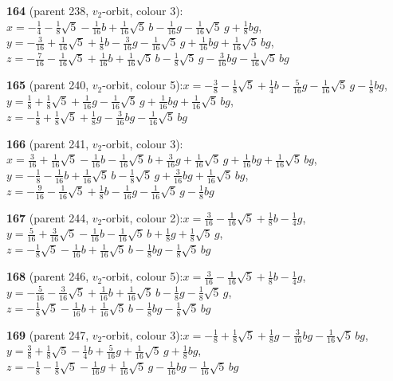 \documentclass[10pt]{article}
\begin{document}
{\noindent\textbf{164} (parent 238, $v_2$-orbit, colour 3):\quad $x=-\tfrac{1}{4}-\tfrac{1}{8}\sqrt5-\tfrac{1}{16}b+\tfrac{1}{16}\sqrt5\,b-\tfrac{1}{16}g-\tfrac{1}{16}\sqrt5\,g+\tfrac{1}{8}bg$,\quad $y=-\tfrac{3}{16}+\tfrac{1}{16}\sqrt5+\tfrac{1}{8}b-\tfrac{3}{16}g-\tfrac{1}{16}\sqrt5\,g+\tfrac{1}{16}bg+\tfrac{1}{16}\sqrt5\,bg$,\quad $z=-\tfrac{7}{16}-\tfrac{1}{16}\sqrt5+\tfrac{1}{16}b+\tfrac{1}{16}\sqrt5\,b-\tfrac{1}{8}\sqrt5\,g-\tfrac{3}{16}bg-\tfrac{1}{16}\sqrt5\,bg$\par\smallskip
\noindent\textbf{165} (parent 240, $v_2$-orbit, colour 5):\quad $x=-\tfrac{3}{8}-\tfrac{1}{8}\sqrt5+\tfrac{1}{4}b-\tfrac{5}{16}g-\tfrac{1}{16}\sqrt5\,g-\tfrac{1}{8}bg$,\quad $y=\tfrac{1}{8}+\tfrac{1}{8}\sqrt5+\tfrac{1}{16}g-\tfrac{1}{16}\sqrt5\,g+\tfrac{1}{16}bg+\tfrac{1}{16}\sqrt5\,bg$,\quad $z=-\tfrac{1}{8}+\tfrac{1}{8}\sqrt5+\tfrac{1}{8}g-\tfrac{3}{16}bg-\tfrac{1}{16}\sqrt5\,bg$\par\smallskip
\noindent\textbf{166} (parent 241, $v_2$-orbit, colour 3):\quad $x=\tfrac{3}{16}+\tfrac{1}{16}\sqrt5-\tfrac{1}{16}b-\tfrac{1}{16}\sqrt5\,b+\tfrac{3}{16}g+\tfrac{1}{16}\sqrt5\,g+\tfrac{1}{16}bg+\tfrac{1}{16}\sqrt5\,bg$,\quad $y=-\tfrac{1}{8}-\tfrac{1}{16}b+\tfrac{1}{16}\sqrt5\,b-\tfrac{1}{8}\sqrt5\,g+\tfrac{3}{16}bg+\tfrac{1}{16}\sqrt5\,bg$,\quad $z=-\tfrac{9}{16}-\tfrac{1}{16}\sqrt5+\tfrac{1}{8}b-\tfrac{1}{16}g-\tfrac{1}{16}\sqrt5\,g-\tfrac{1}{8}bg$\par\smallskip
\noindent\textbf{167} (parent 244, $v_2$-orbit, colour 2):\quad $x=\tfrac{3}{16}-\tfrac{1}{16}\sqrt5+\tfrac{1}{8}b-\tfrac{1}{4}g$,\quad $y=\tfrac{5}{16}+\tfrac{3}{16}\sqrt5-\tfrac{1}{16}b-\tfrac{1}{16}\sqrt5\,b+\tfrac{1}{8}g+\tfrac{1}{8}\sqrt5\,g$,\quad $z=-\tfrac{1}{8}\sqrt5-\tfrac{1}{16}b+\tfrac{1}{16}\sqrt5\,b-\tfrac{1}{8}bg-\tfrac{1}{8}\sqrt5\,bg$\par\smallskip
\noindent\textbf{168} (parent 246, $v_2$-orbit, colour 5):\quad $x=\tfrac{3}{16}-\tfrac{1}{16}\sqrt5+\tfrac{1}{8}b-\tfrac{1}{4}g$,\quad $y=-\tfrac{5}{16}-\tfrac{3}{16}\sqrt5+\tfrac{1}{16}b+\tfrac{1}{16}\sqrt5\,b-\tfrac{1}{8}g-\tfrac{1}{8}\sqrt5\,g$,\quad $z=-\tfrac{1}{8}\sqrt5-\tfrac{1}{16}b+\tfrac{1}{16}\sqrt5\,b-\tfrac{1}{8}bg-\tfrac{1}{8}\sqrt5\,bg$\par\smallskip
\noindent\textbf{169} (parent 247, $v_2$-orbit, colour 3):\quad $x=-\tfrac{1}{8}+\tfrac{1}{8}\sqrt5+\tfrac{1}{8}g-\tfrac{3}{16}bg-\tfrac{1}{16}\sqrt5\,bg$,\quad $y=\tfrac{3}{8}+\tfrac{1}{8}\sqrt5-\tfrac{1}{4}b+\tfrac{5}{16}g+\tfrac{1}{16}\sqrt5\,g+\tfrac{1}{8}bg$,\quad $z=-\tfrac{1}{8}-\tfrac{1}{8}\sqrt5-\tfrac{1}{16}g+\tfrac{1}{16}\sqrt5\,g-\tfrac{1}{16}bg-\tfrac{1}{16}\sqrt5\,bg$\par\smallskip
}
\end{document}

